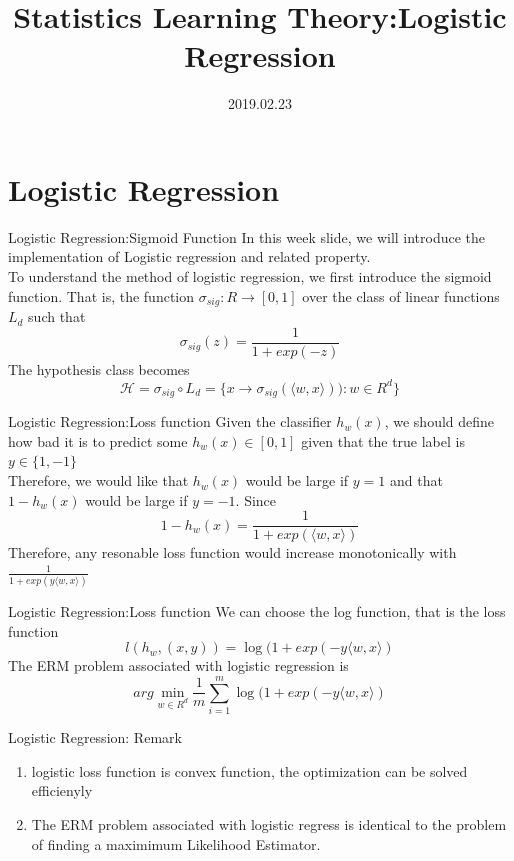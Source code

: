 \documentclass{beamer}
\title[Introduction]{Statistics Learning Theory:Logistic Regression}
\author{}
\institute{}
\date{2019.02.23}
\begin{document}
\begin{frame}
  \titlepage
\end{frame}


\section{Logistic Regression}
\begin{frame}{Logistic Regression:Sigmoid Function}
	In this week slide, we will introduce the implementation of Logistic regression and related property. \\
	To understand the method of logistic regression, we first introduce the sigmoid function. That is, the function $\sigma_{sig}:R \rightarrow [0,1]$ over the class of linear functions $L_d$ such that
	\[\sigma_{sig}(z) = \frac{1}{1+exp(-z)}\]
	The hypothesis class becomes
\[\mathcal{H} = \sigma_{sig} \circ L_d = \{x \rightarrow \sigma_{sig}(\langle w,x \rangle)): w \in R^d\}\]
\end{frame}
\begin{frame}{Logistic Regression:Loss function}
	Given the classifier $h_{w}(x)$, we should define how bad it is to predict some $h_w(x) \in [0,1]$ given that the true label is $y \in \{1,-1\}$ \\
	Therefore, we would like that $h_w(x)$ would be large if $y=1$ and that $1-h_w(x)$ would be large if $y=-1$. Since
	\[1 - h_w(x) = \frac{1}{1+exp(\langle w,x \rangle)}\]
	Therefore, any resonable loss function would increase monotonically with $\frac{1}{1+exp( y \langle w,x \rangle)}$
\end{frame}
\begin{frame}{Logistic Regression:Loss function}
	We can choose the log function, that is the loss function
	\[l(h_w,(x,y)) = \log (1+exp( -y \langle w,x \rangle)\]
	The ERM problem associated with logistic regression is 
	\[arg\min_{w \in R^d} \frac{1}{m} \sum^m_{i=1} \log(1+exp( -y \langle w,x \rangle)\]
\end{frame}
\begin{frame}{Logistic Regression: Remark}
	\begin{enumerate}
		\item logistic loss function is convex function, the optimization can be solved efficienyly
		\item The ERM problem associated with logistic regress is identical to the problem of finding a maximimum Likelihood Estimator.
	\end{enumerate}
\end{frame}
\end{document}
